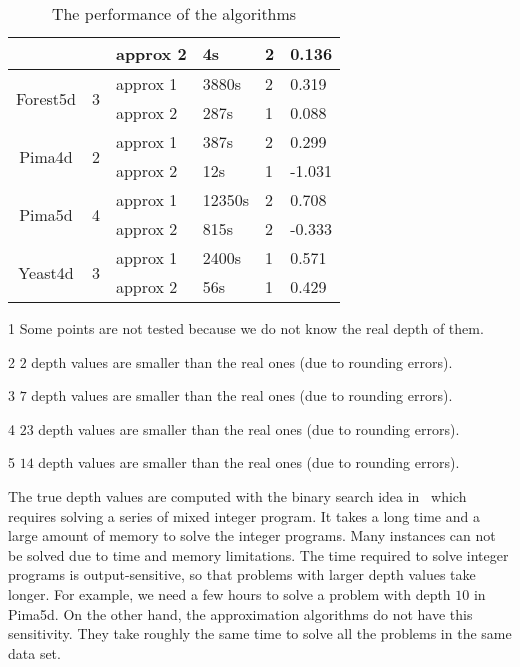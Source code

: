\documentclass[preprint, 12pt]{elsarticle}
\begin{document}
\begin{table}[!htb]
\begin{threeparttable}[b]
\begin{tabular}[center]{|c|c|l|l|l|l|}
      & & approx 2 & 4s & 2 & 0.136 \\
      \hline
      \multirow{2}{*}{Forest5d} & \multirow{2}{*}{3} & approx 1 & 3880s & 2 & 0.319\tnote{2} \\
      & & approx 2 & 287s & 1 & 0.088\tnote{3} \\
      \hline
      \multirow{2}{*}{Pima4d} & \multirow{2}{*}{2} & approx 1 & 387s & 2 & 0.299 \\
      & & approx 2 & 12s & 1 & -1.031\tnote{4} \\
      \hline
      \multirow{2}{*}{Pima5d} & \multirow{2}{*}{4} & approx 1 & 12350s & 2 & 0.708 \\
      & & approx 2 & 815s & 2 & -0.333\tnote{5} \\
      \hline
      \multirow{2}{*}{Yeast4d} & \multirow{2}{*}{3} & approx 1 & 2400s & 1 & 0.571 \\
      & & approx 2 & 56s & 1 & 0.429 \\
      \hline
    \end{tabular}
    \begin{tablenotes}
    \item [1] Some points are not tested because we do not know the real depth of them.
    \item [2] $2$ depth values are smaller than the real ones (due to rounding errors).
    \item [3] $7$ depth values are smaller than the real ones (due to rounding errors).
    \item [4] $23$ depth values are smaller than the real ones (due to rounding errors).
    \item [5] $14$ depth values are smaller than the real ones (due to rounding errors).
    \end{tablenotes}
    \caption{The performance of the algorithms}
    \label{tab:performance}
  \end{threeparttable}
\end{table}


The true depth values are computed with the binary search idea in~\cite{Chen07} which requires solving a series of mixed integer program. It takes a long time and a large amount of memory to solve the integer programs. Many instances can not be solved due to time and memory limitations. The time required to solve integer programs is output-sensitive, so that problems with larger depth values take longer. For example, we need a few hours to solve a problem with depth $10$ in Pima5d. On the other hand, the approximation algorithms do not have this sensitivity. They take roughly the same time to solve all the problems in the same data set.
\end{document}
